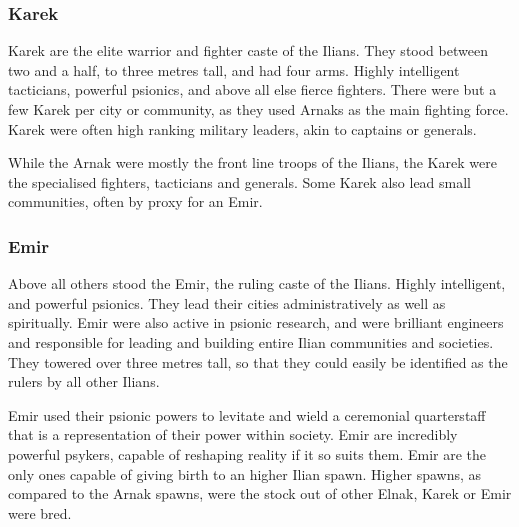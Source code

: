 \subsubsection{Karek}
\label{sec:Karek}

Karek are the elite warrior and fighter caste of the Ilians. They stood between
two and a half, to three metres tall, and had four arms. Highly intelligent
tacticians, powerful psionics, and above all else fierce fighters. There were
but a few Karek per city or community, as they used Arnaks as the main fighting
force. Karek were often high ranking military leaders, akin to captains or
generals.

While the Arnak were mostly the front line troops of the Ilians, the Karek were
the specialised fighters, tacticians and generals. Some Karek also lead small
communities, often by proxy for an Emir.

\subsubsection{Emir}
\label{sec:Emir}

Above all others stood the Emir, the ruling caste of the Ilians. Highly
intelligent, and powerful psionics. They lead their cities administratively as
well as spiritually. Emir were also active in psionic research, and were
brilliant engineers and responsible for leading and building entire Ilian
communities and societies. They towered over three metres tall, so that they
could easily be identified as the rulers by all other Ilians.

Emir used their psionic powers to levitate and wield a ceremonial
quarterstaff that is a representation of their power within society. Emir are
incredibly powerful psykers, capable of reshaping reality if it so suits
them. Emir are the only ones capable of giving birth to an higher Ilian
spawn. Higher spawns, as compared to the Arnak spawns, were the stock out of
other Elnak, Karek or Emir were bred.
